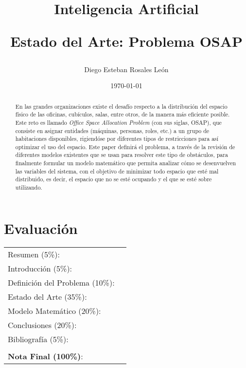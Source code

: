 \documentclass[letter, 10pt]{article}
\begin{document}
\title{Inteligencia Artificial \\ \begin{Large}Estado del Arte: Problema OSAP\end{Large}}
\author{Diego Esteban Rosales Le\'on}
\date{\today}
\maketitle


\section*{Evaluaci\'on}

\begin{tabular}{ll}
Resumen (5\%): & \underline{\hspace{2cm}} \\
Introducci\'on (5\%):  & \underline{\hspace{2cm}} \\
Definici\'on del Problema (10\%):  & \underline{\hspace{2cm}} \\
Estado del Arte (35\%):  & \underline{\hspace{2cm}} \\
Modelo Matem\'atico (20\%): &  \underline{\hspace{2cm}}\\
Conclusiones (20\%): &  \underline{\hspace{2cm}}\\
Bibliograf\'ia (5\%): & \underline{\hspace{2cm}}\\
 &  \\
\textbf{Nota Final (100\%)}:   & \underline{\hspace{2cm}}
\end{tabular}
\vspace{2cm}

\begin{abstract}
En las grandes organizaciones existe el desaf\'io respecto a la distribuci\'on del espacio f\'isico de las oficinas, cub\'iculos, salas, entre otros, de la manera m\'as eficiente posible. Este reto es llamado \textit{Office Space Allocation Problem} (con sus siglas, OSAP), que consiste en asignar entidades (m\'aquinas, personas, roles, etc.) a un grupo de habitaciones disponibles, rigiend\'ose por diferentes tipos de restricciones para as\'i optimizar el uso del espacio. Este paper definir\'a el problema, a trav\'es de la revisi\'on de diferentes modelos existentes que se usan para resolver este tipo de obst\'aculos, para finalmente formular un modelo matem\'atico que permita analizar c\'omo se desenvuelven las variables del sistema, con el objetivo de minimizar todo espacio que est\'e mal distribuido, es decir, el espacio que no se est\'e ocupando y el que se est\'e sobre utilizando.

\end{abstract}
\end{document}
